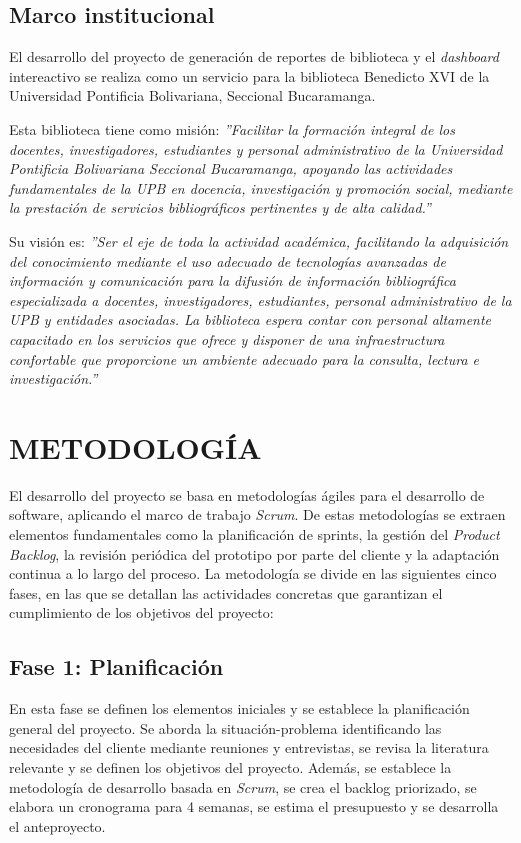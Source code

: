 \documentclass[spanish]{ieee_upb}
\begin{document}
\subsection{Marco institucional}


El desarrollo del proyecto de generación de reportes de biblioteca y el \textit{dashboard} intereactivo se realiza como un servicio para la biblioteca Benedicto XVI de la Universidad Pontificia Bolivariana, Seccional Bucaramanga.

Esta biblioteca tiene como misión:
\textit{''Facilitar la formación integral de los docentes, investigadores, estudiantes y personal administrativo de la Universidad Pontificia Bolivariana Seccional Bucaramanga, apoyando las actividades fundamentales de la UPB en docencia, investigación y promoción social, mediante la prestación de servicios bibliográficos pertinentes y de alta calidad.''}\cite{UPB_Biblioteca}

Su visión es:
\textit{''Ser el eje de toda la actividad académica, facilitando la adquisición del conocimiento mediante el uso adecuado de tecnologías avanzadas de información y comunicación para la difusión de información bibliográfica especializada a docentes, investigadores, estudiantes, personal administrativo de la UPB y entidades asociadas. La biblioteca espera contar con personal altamente capacitado en los servicios que ofrece y disponer de una infraestructura confortable que proporcione un ambiente adecuado para la consulta, lectura e investigación.''} \cite{UPB_Biblioteca}








\newpage
\section{METODOLOGÍA}
\vspace{0.3cm}
El desarrollo del proyecto se basa en metodologías ágiles para el desarrollo de software, aplicando el marco de trabajo \textit{Scrum}. De estas metodologías se extraen elementos fundamentales como la planificación de sprints, la gestión del \textit{Product Backlog}, la revisión periódica del prototipo por parte del cliente y la adaptación continua a lo largo del proceso.
La metodología se divide en las siguientes cinco fases, en las que se detallan las actividades concretas que garantizan el cumplimiento de los objetivos del proyecto:

\subsection{Fase 1: Planificación}
\vspace{0.3cm}
En esta fase se definen los elementos iniciales y se establece la planificación general del proyecto. Se aborda la situación-problema identificando las necesidades del cliente mediante reuniones y entrevistas, se revisa la literatura relevante y se definen los objetivos del proyecto. Además, se establece la metodología de desarrollo basada en \textit{Scrum}, se crea el backlog priorizado, se elabora un cronograma para 4 semanas, se estima el presupuesto y se desarrolla el anteproyecto.
\end{document}
